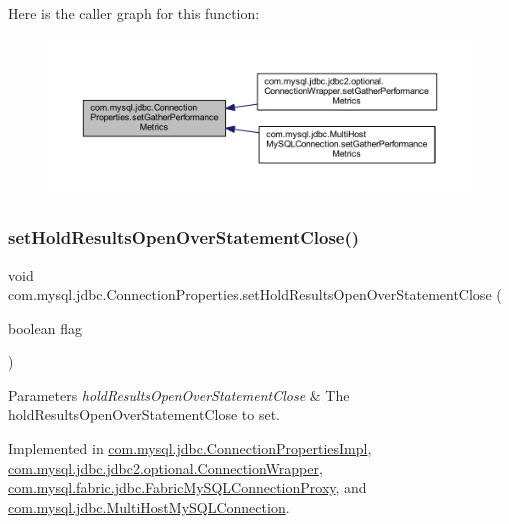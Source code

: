 Here is the caller graph for this function\+:\nopagebreak
\begin{figure}[H]
\begin{center}
\leavevmode
\includegraphics[width=350pt]{interfacecom_1_1mysql_1_1jdbc_1_1_connection_properties_a8083ba3dcac8d6d8ec42c635f0f19be4_icgraph}
\end{center}
\end{figure}
\mbox{\label{interfacecom_1_1mysql_1_1jdbc_1_1_connection_properties_a9447a03edd2efdd020960e0a12d22aa7}} 
\subsubsection{\texorpdfstring{set\+Hold\+Results\+Open\+Over\+Statement\+Close()}{setHoldResultsOpenOverStatementClose()}}
{\footnotesize\ttfamily void com.\+mysql.\+jdbc.\+Connection\+Properties.\+set\+Hold\+Results\+Open\+Over\+Statement\+Close (\begin{DoxyParamCaption}\item[{boolean}]{flag }\end{DoxyParamCaption})}


\begin{DoxyParams}{Parameters}
{\em hold\+Results\+Open\+Over\+Statement\+Close} & The hold\+Results\+Open\+Over\+Statement\+Close to set. \\
\hline
\end{DoxyParams}


Implemented in \mbox{\hyperlink{classcom_1_1mysql_1_1jdbc_1_1_connection_properties_impl_a4d50d1c91f82a50ecff1012758beaa75}{com.\+mysql.\+jdbc.\+Connection\+Properties\+Impl}}, \mbox{\hyperlink{classcom_1_1mysql_1_1jdbc_1_1jdbc2_1_1optional_1_1_connection_wrapper_a0b8d475aec95896806332ff84d251468}{com.\+mysql.\+jdbc.\+jdbc2.\+optional.\+Connection\+Wrapper}}, \mbox{\hyperlink{classcom_1_1mysql_1_1fabric_1_1jdbc_1_1_fabric_my_s_q_l_connection_proxy_a2f4cb90ed905a23871cc223ec1ab1e46}{com.\+mysql.\+fabric.\+jdbc.\+Fabric\+My\+S\+Q\+L\+Connection\+Proxy}}, and \mbox{\hyperlink{classcom_1_1mysql_1_1jdbc_1_1_multi_host_my_s_q_l_connection_a12b7bd6460f769ac0ef7b34c7fbc9808}{com.\+mysql.\+jdbc.\+Multi\+Host\+My\+S\+Q\+L\+Connection}}.

